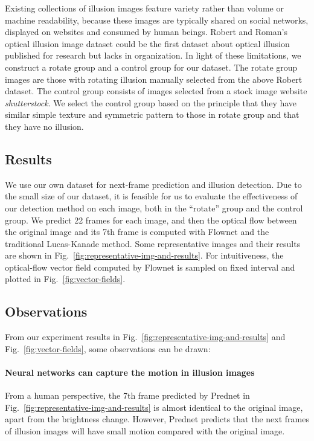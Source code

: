 \documentclass[journal]{IEEEtran}
\begin{document}
  Existing collections of illusion images feature variety rather than volume or machine readability, because these images are typically shared on social networks, displayed on websites and consumed by human beings. Robert and Roman's optical illusion image dataset \cite{williams2018optical} could be the first dataset about optical illusion published for research but lacks in organization. In light of these limitations, we construct a rotate group and a control group for our dataset. The rotate group images are those with rotating illusion manually selected from the above Robert dataset. The control group consists of images selected from a stock image website \emph{shutterstock}. We select the control group based on the principle that they have similar simple texture and symmetric pattern to those in rotate group and that they have no illusion.
  
  \subsection{Results}
  
  We use our own dataset for next-frame prediction and illusion detection. Due to the small size of our dataset, it is feasible for us to evaluate the effectiveness of our detection method on each image, both in the ``rotate'' group and the control group. We predict 22 frames for each image, and then the optical flow between the original image and its 7th frame is computed with Flownet and the traditional Lucas-Kanade method. Some representative images and their results are shown in Fig.~\ref{fig:representative-img-and-results}. For intuitiveness, the optical-flow vector field computed by Flownet is sampled on fixed interval and plotted in Fig.~\ref{fig:vector-fields}.
  
  \subsection{Observations}
  
  From our experiment results in Fig.~\ref{fig:representative-img-and-results} and Fig.~\ref{fig:vector-fields}, some observations can be drawn:
  
  \paragraph{Neural networks can capture the motion in illusion images} From a human perspective, the 7th frame predicted by Prednet in Fig.~\ref{fig:representative-img-and-results} is almost identical to the original image, apart from the brightness change. However, Prednet predicts that the next frames of illusion images will have small motion compared with the original image.
  
\end{document}
